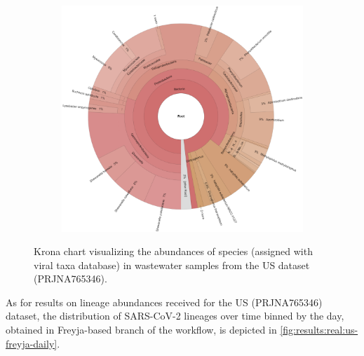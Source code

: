 \begin{figure}[H]
\begin{subfigure}[b]{0.3\textwidth}
        \label{fig:results:real:krona-us-b}
        \end{subfigure}
        \hfill
        \begin{subfigure}[b]{0.3\textwidth}
        \includegraphics[width=1\textwidth]{figures/results/real/krona/krona-us-all.png}
        \label{fig:results:real:krona-us-c}
        \end{subfigure}
        \caption{Krona chart visualizing the abundances of species (assigned with viral taxa database) in wastewater samples from the US dataset (PRJNA765346).}
    \end{figure}
    
    As for results on lineage abundances received for the US (PRJNA765346) dataset, the distribution of SARS-CoV-2 lineages over time binned by the day, obtained in Freyja-based branch of the workflow, is depicted in \cref{fig:results:real:us-freyja-daily}.
    
